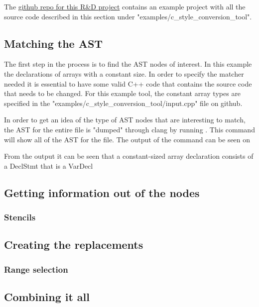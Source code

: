The \href{https://github.com/mortenhaahr/RD}{github repo for this R\&D project} contains an example project with all the source code described in this section under "examples/c\_style\_conversion\_tool".

\subsection{Matching the AST}

The first step in the process is to find the AST nodes of interest. In this example the declarations of arrays with a constant size. In order to specify the matcher needed it is essential to have some valid C++ code that contains the source code that needs to be changed. For this example tool, the constant array types are specified in the "examples/c\_style\_conversion\_tool/input.cpp" file on github.

In order to get an idea of the type of AST nodes that are interesting to match, the AST for the entire file is "dumped" through clang by running . This command will show all of the AST for the file. The output of the command can be seen on 

\begin{figure}[H]
    
    \lab
\end{figure}


From the output it can be seen that a constant-sized array declaration consists of a DeclStmt that is a VarDecl


\subsection{Getting information out of the nodes}

\subsubsection{Stencils}

\subsection{Creating the replacements}

\subsubsection{Range selection}

\subsection{Combining it all}